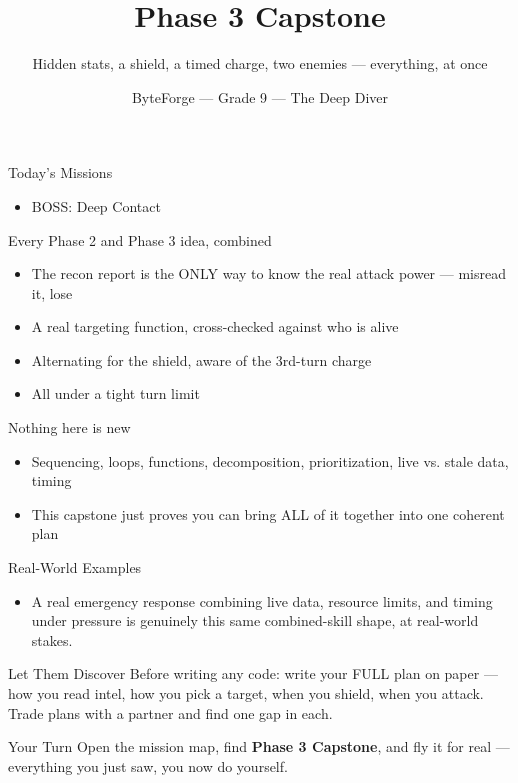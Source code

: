 \documentclass[aspectratio=169]{beamer}
\title{Phase 3 Capstone}
\subtitle{Hidden stats, a shield, a timed charge, two enemies --- everything, at once}
\author{ByteForge --- Grade 9 --- The Deep Diver}
\date{}
\begin{document}
\begin{frame}
    \titlepage
\end{frame}

\begin{frame}{Today's Missions}
    \Large
    \begin{itemize}
        \item BOSS: Deep Contact
    \end{itemize}
\end{frame}

\begin{frame}{Every Phase 2 and Phase 3 idea, combined}
    \large
    \begin{itemize}
        \item The recon report is the ONLY way to know the real attack power --- misread it, lose
        \item A real targeting function, cross-checked against who is alive
        \item Alternating for the shield, aware of the 3rd-turn charge
        \item All under a tight turn limit
    \end{itemize}
\end{frame}


\begin{frame}{Nothing here is new}
    \large
    \begin{itemize}
        \item Sequencing, loops, functions, decomposition, prioritization, live vs. stale data, timing
        \item This capstone just proves you can bring ALL of it together into one coherent plan
    \end{itemize}
\end{frame}

\begin{frame}{Real-World Examples}
    \large
    \begin{itemize}
        \item A real emergency response combining live data, resource limits, and timing under pressure is genuinely this same combined-skill shape, at real-world stakes.
    \end{itemize}
\end{frame}


\begin{frame}{Let Them Discover}
    \large
    Before writing any code: write your FULL plan on paper --- how you read intel, how you pick a target, when you shield, when you attack. Trade plans with a partner and find one gap in each.
\end{frame}

\begin{frame}{Your Turn}
    \Large
    Open the mission map, find \textbf{Phase 3 Capstone}, and fly it for real ---
    everything you just saw, you now do yourself.
\end{frame}
\end{document}
